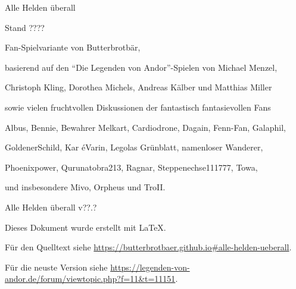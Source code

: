 \documentclass[10pt, a4paper, oneside]{book}
\begin{document}
\setcounter{page}{2} %
\thispagestyle{plain}

\begin{center}
    \vspace*{8em}

    \LARGE
    Alle Helden überall

    Stand ????

    \vspace{2em}

    \large
    Fan-Spielvariante von Butterbrotbär,
    
    basierend auf den \enquote{Die Legenden von Andor}-Spielen von Michael Menzel,
    
    Christoph Kling, Dorothea Michels, Andreas Kälber und Matthias Miller
    
    sowie vielen fruchtvollen Diskussionen der fantastisch fantasievollen Fans
    
    Albus, Bennie, Bewahrer Melkart, Cardiodrone, Dagain, Fenn-Fan, Galaphil,
    
    GoldenerSchild, Kar éVarin, Legolas Grünblatt, namenloser Wanderer,
    
    Phoenixpower, Qurunatobra213, Ragnar, Steppenechse111777, Towa,
    
    und insbesondere Mivo, Orpheus und TroII.

    \vfill 
    
    Alle Helden überall v??.?
    
    Dieses Dokument wurde erstellt mit \LaTeX{}.
    
    Für den Quelltext siehe \url{https://butterbrotbaer.github.io#alle-helden-ueberall}.
    
    Für die neuste Version siehe \url{https://legenden-von-andor.de/forum/viewtopic.php?f=11&t=11151}.
\end{center}

\newpage



\thispagestyle{plain}
\end{document}

